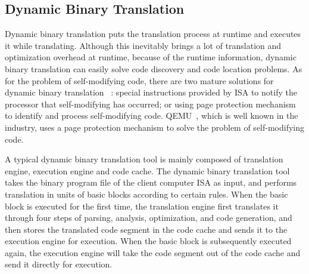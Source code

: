 \subsection{Dynamic Binary Translation}
Dynamic binary translation puts the translation process at runtime and executes it while translating. 
Although this inevitably brings a lot of translation and optimization overhead at runtime, because of the runtime information, dynamic binary translation can easily solve code discovery and code location problems. 
As for the problem of self-modifying code, there are two mature solutions for dynamic binary translation ~\cite{probst2002dynamic}: special instructions provided by ISA to notify the processor that self-modifying has occurred; or using page protection mechanism to identify and process self-modifying code. 
QEMU~\cite{DBLP:conf/usenix/Bellard05}, which is well known in the industry, uses a page protection mechanism to solve the problem of self-modifying code.

A typical dynamic binary translation tool is mainly composed of translation engine, execution engine and code cache. 
The dynamic binary translation tool takes the binary program file of the client computer ISA as input, and performs translation in units of basic blocks according to certain rules. 
When the basic block is executed for the first time, the translation engine first translates it through four steps of parsing, analysis, optimization, and code generation, and then stores the translated code segment in the code cache and sends it to the execution engine for execution. 
When the basic block is subsequently executed again, the execution engine will take the code segment out of the code cache and send it directly for execution.
